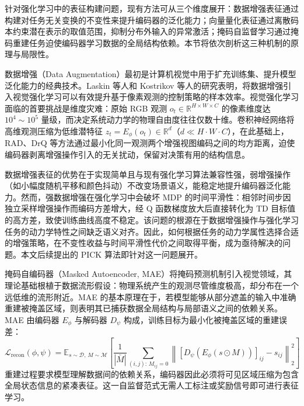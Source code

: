 针对强化学习中的表征构建问题，现有方法可从三个维度展开：数据增强表征通过构建对任务无关变换的不变性来提升编码器的泛化能力；向量量化表征通过离散码本约束潜在表示的取值范围，抑制分布外输入的异常激活；掩码自监督学习通过掩码重建任务迫使编码器学习数据的全局结构依赖。本节将依次剖析这三种机制的原理与局限性。


数据增强（Data Augmentation）最初是计算机视觉中用于扩充训练集、提升模型泛化能力的经典技术。Laskin 等人\cite{laskin2020reinforcement}和 Kostrikov 等人\cite{kostrikov2020image}的研究表明，将数据增强引入视觉强化学习可以有效提升基于像素观测的控制策略的样本效率。视觉强化学习面临的首要挑战是维度灾难：原始 RGB 观测 $o_t \in \mathbb{R}^{H \times W \times C}$ 的像素维度达 $10^4 \sim 10^5$ 量级，而决定系统动力学的物理自由度往往仅数十维。卷积神经网络将高维观测压缩为低维潜特征 $z_t = E_\phi(o_t) \in \mathbb{R}^d$（$d \ll H \cdot W \cdot C$），在此基础上，RAD\cite{laskin2020reinforcement}、DrQ\cite{kostrikov2020image} 等方法通过最小化同一观测两个增强视图编码之间的均方距离，迫使编码器剥离增强操作引入的无关扰动，保留对决策有用的结构信息。

数据增强表征的优势在于实现简单且与现有强化学习算法兼容性强，弱增强操作（如小幅度随机平移和颜色抖动）不改变场景语义，能稳定地提升编码器泛化能力。然而，强数据增强在强化学习中会破坏 MDP 的时间平滑性：相邻时间步因独立采样增强操作而编码方差增大，经 Q 函数梯度放大后直接转化为 TD 目标值的高方差，致使训练曲线高度不稳定。该问题的根源在于数据增强操作与强化学习任务的动力学特性之间缺乏语义对齐。因此，如何根据任务的动力学属性选择合适的增强策略，在不变性收益与时间平滑性代价之间取得平衡，成为亟待解决的问题。本文后续提出的 PICK 算法即针对这一问题展开。



掩码自编码器（Masked Autoencoder, MAE）\cite{he2022masked}将掩码预测机制引入视觉领域，其理论基础根植于数据流形假设：物理系统产生的观测尽管维度极高，却分布在一个远低维的流形附近。MAE 的基本原理在于，若模型能够从部分遮盖的输入中准确重建被掩盖区域，则表明其已捕获数据全局结构与局部语义之间的依赖关系。MAE 由编码器 $E_\phi$ 与解码器 $D_\psi$ 构成，训练目标为最小化被掩盖区域的重建误差：
\begin{equation}
    \mathcal{L}_{\mathrm{recon}}(\phi, \psi) = \mathbb{E}_{s \sim \mathcal{D},\, M \sim \mathcal{M}}\!\left[ \frac{1}{|\bar{M}|}\sum_{(i,j):\, M_{ij}=0} \left\| \left[ D_\psi\!\left( E_\phi(s \odot M) \right) \right]_{ij} - s_{ij} \right\|_2^2 \right]
\end{equation}
重建过程要求模型理解数据间的依赖关系，编码器因此必须将可见区域压缩为包含全局状态信息的紧凑表征。这一自监督范式无需人工标注或奖励信号即可进行表征学习。

